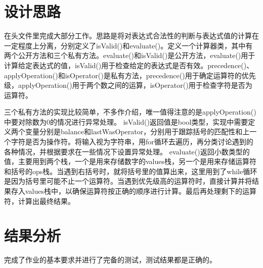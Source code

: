 \documentclass[UTF8]{ctexart}
\begin{document}
\pagestyle{fancy}
\fancyhead{}

\section{设计思路}

在头文件里完成大部分工作。思路是将对表达式合法性的判断与表达式值的计算在一定程度上分离，分别定义了isValid()和evaluate()。定义一个计算器类，其中有两个公开方法和三个私有方法。evaluate()和isValid()是公开方法，evaluate()用于计算给定表达式的值，isValid()用于检查给定的表达式是否有效。precedence()、applyOperation()和isOperator()是私有方法，precedence()用于确定运算符的优先级，applyOperation()用于两个数之间的运算，isOperator()用于检查字符是否为运算符。

三个私有方法的实现比较简单，不多作介绍，唯一值得注意的是applyOperation()中要对除数为0的情况进行异常处理。
isValid()返回值是bool类型，实现中需要定义两个变量分别是balance和lastWasOperator，分别用于跟踪括号的匹配性和上一个字符是否为操作符。将输入视为字符串，用for循环去遍历，再分类讨论遇到的各种情况，并根据要求在一些情况下设置异常处理。
evaluate()返回小数类型的值，主要用到两个栈，一个是用来存储数字的values栈，另一个是用来存储运算符和括号的ops栈。当遇到右括号时，就将括号里的值算出来，这里用到了while循环是因为括号里可能不止一个运算符。当遇到优先级高的运算符时，直接计算并将结果存入values栈中，以确保运算符按正确的顺序进行计算。最后再处理剩下的运算符，计算出最终结果。

\section{结果分析}

完成了作业的基本要求并进行了完备的测试，测试结果都是正确的。
\end{document}
